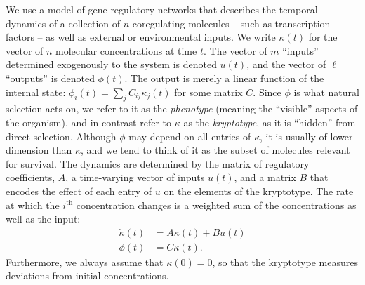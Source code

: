 \documentclass{article}
\newcommand{\1}{\mathbbm{1}}
\begin{document}
We use a model of gene regulatory networks
that describes the temporal dynamics of
a collection of $n$ coregulating molecules
-- such as transcription factors -- as well as external or environmental inputs.
We write $\kappa(t)$ for the vector of $n$ molecular concentrations at time $t$.
The vector of $m$ ``inputs'' determined exogenously to the system is denoted $u(t)$,
and the vector of $\ell$ ``outputs'' is denoted $\phi(t)$.
The output is merely a linear function of the internal state:
$\phi_i(t) = \sum_j C_{ij} \kappa_j(t)$
for some matrix $C$.
Since $\phi$ is what natural selection acts on, we refer to it as the \emph{phenotype}
(meaning the ``visible'' aspects of the organism),
and in contrast refer to $\kappa$ as the \emph{kryptotype},
as it is ``hidden'' from direct selection.
Although $\phi$ may depend on all entries of $\kappa$,
it is usually of lower dimension than $\kappa$,
and we tend to think of it as the subset of molecules relevant for survival.
The dynamics are determined by
the matrix of regulatory coefficients, $A$,
a time-varying vector of inputs $u(t)$,
and a matrix $B$ that encodes the effect of each entry of $u$ on the elements of the kryptotype.
The rate at which the $i^\text{th}$ concentration changes
is a weighted sum of the concentrations
as well as the input:
\begin{equation}\label{eqn:system}
   \begin{aligned}
    \dot{\kappa}(t) &= A \kappa(t) + B u(t) \\
    \phi(t) &= C \kappa(t) .
  \end{aligned} 
\end{equation}
Furthermore, we always assume that $\kappa(0) = 0$,
so that the kryptotype measures deviations from initial concentrations. 
\end{document}
